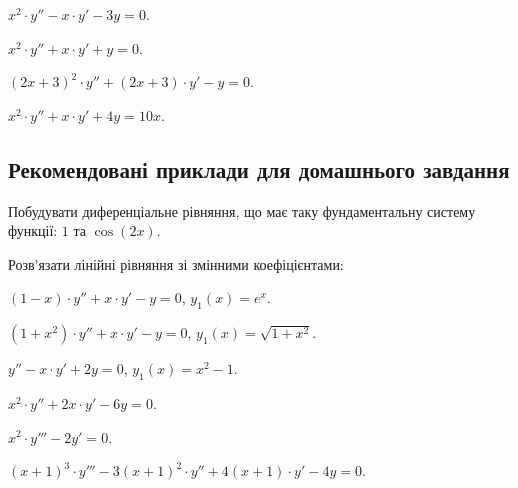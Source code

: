 \begin{problem}
	$x^2 \cdot y'' - x \cdot y' - 3 y = 0$.
\end{problem}

\begin{problem}
	$x^2 \cdot y'' + x \cdot y' + y = 0$.
\end{problem}

\begin{problem}
	$(2 x + 3)^2 \cdot y'' + (2 x + 3) \cdot y' - y = 0$.
\end{problem}

\begin{problem}
	$x^2 \cdot y'' + x \cdot y' + 4 y = 10 x$.
\end{problem}

\subsection*{Рекомендовані приклади для домашнього завдання}

\begin{problem}
	Побудувати диференціальне рівняння, що має таку фундаментальну систему функції: $1$ та $\cos (2x)$.
\end{problem}

Розв'язати лінійні рівняння зі змінними коефіцієнтами:

\begin{problem}
	$(1 - x) \cdot y'' + x \cdot y' - y = 0$, $y_1(x) = e^x$. 
\end{problem}

\begin{problem}
	$(1 + x^2) \cdot y'' + x \cdot y' - y = 0$, $y_1(x) = \sqrt{1 + x^2}$.
\end{problem}

\begin{problem}
	$y'' - x \cdot y' + 2 y = 0$, $y_1(x) = x^2 - 1$.
\end{problem}

\begin{problem}
	$x^2 \cdot y'' + 2 x \cdot y' - 6 y = 0$.
\end{problem}

\begin{problem}
	$x^2 \cdot y''' - 2 y' = 0$.
\end{problem}

\begin{problem}
	$(x + 1)^3 \cdot y''' - 3 (x + 1)^2 \cdot y'' + 4 (x + 1) \cdot y' - 4 y = 0$.
\end{problem}

